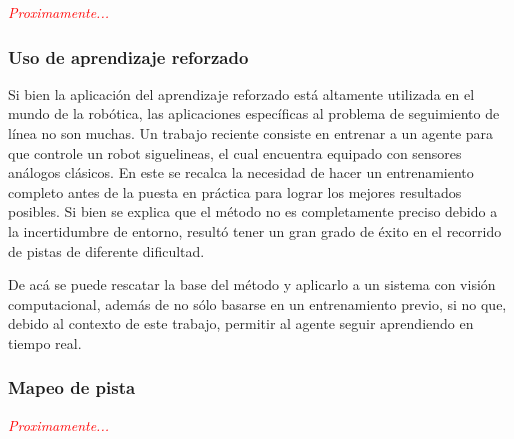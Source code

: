\textit{\textcolor{red}{Proximamente...}}

\subsubsection{Uso de aprendizaje reforzado}
Si bien la aplicación del aprendizaje reforzado está altamente utilizada en el mundo de la robótica, las aplicaciones específicas al problema de seguimiento de línea no son muchas. Un trabajo reciente \cite{analogrl} consiste en entrenar a un agente para que controle un robot siguelineas, el cual encuentra equipado con sensores análogos clásicos. En este se recalca la necesidad de hacer un entrenamiento completo antes de la puesta en práctica para lograr los mejores resultados posibles. Si bien se explica que el método no es completamente preciso debido a la incertidumbre de entorno, resultó tener un gran grado de éxito en el recorrido de pistas de diferente dificultad. 

De acá se puede rescatar la base del método y aplicarlo a un sistema con visión computacional, además de no sólo basarse en un entrenamiento previo, si no que, debido al contexto de este trabajo, permitir al agente seguir aprendiendo en tiempo real.

\subsubsection{Mapeo de pista}

\textit{\textcolor{red}{Proximamente...}}

